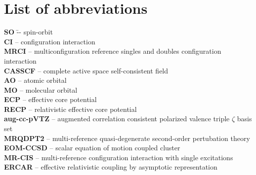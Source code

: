 \chapter{List of abbreviations}
\begin{tabbing}
\textbf{SO} \qquad \qquad \qquad \=-- spin-orbit\\



\textbf{CI}		\>-- configuration interaction\\
\textbf{MRCI}		\>-- multiconfiguration reference singles and doubles configuration interaction\\
\textbf{CASSCF}		\>-- complete active space self-consistent field\\
\textbf{AO} 		\>-- atomic orbital\\
\textbf{MO} 		\>-- molecular orbital\\
\textbf{ECP}		\>-- effective core potential\\
\textbf{RECP}		\>-- relativistic effective core potential\\
\textbf{aug-cc-pVTZ}	\>-- augmented correlation consistent polarized valence triple $\zeta$ basis set\\
\textbf{MRQDPT2}	\>-- multi-reference quasi-degenerate second-order pertubation theory \\
\textbf{EOM-CCSD}	\>-- scalar equation of motion coupled cluster \\
\textbf{MR-CIS}		\>-- multi-reference configuration interaction with single excitations \\ 


\textbf{ERCAR}		\>-- effective relativistic coupling by asymptotic representation\\

\end{tabbing}
